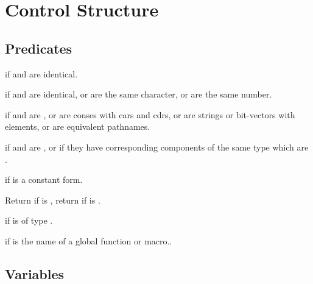 \section{Control Structure}

\subsection{Predicates}
\begin{LIST}{1cm}

  \retval{\T} if  and  are identical.

  \retval{\T} if  and 
  are identical, or are the same character, or are the same number.

  \retval{\T} if  and 
  are , or are conses with  cars and cdrs, or are
  strings or bit-vectors with   elements, or are equivalent pathnames.

  \retval{\T} if  and 
  are , or if they have corresponding components of the same
  type which are .

  \retval{\T} if  is a constant form.

  Return \retval{\NIL} if  is \T, return \retval{\T} if  is \NIL.

  \retval{\T} if  is of type .

  \retval{\T} if  is the name of a global function or macro..


\end{LIST}


\subsection{Variables}


